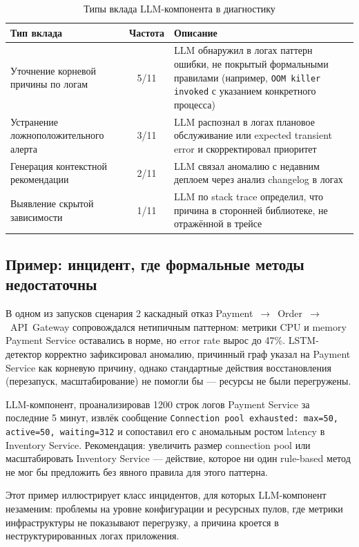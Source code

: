 \begin{table}[H]
\centering
\small
\caption{Типы вклада LLM-компонента в диагностику}
\label{tab:llm_contribution_types}
\begin{tabular}{|p{4cm}|c|p{6cm}|}
\hline
\textbf{Тип вклада} & \textbf{Частота} & \textbf{Описание} \\
\hline
Уточнение корневой причины по логам & 5/11 & LLM обнаружил в логах паттерн ошибки, не покрытый формальными правилами (например, \texttt{OOM killer invoked} с указанием конкретного процесса) \\
\hline
Устранение ложноположительного алерта & 3/11 & LLM распознал в логах плановое обслуживание или expected transient error и скорректировал приоритет \\
\hline
Генерация контекстной рекомендации & 2/11 & LLM связал аномалию с недавним деплоем через анализ changelog в логах \\
\hline
Выявление скрытой зависимости & 1/11 & LLM по stack trace определил, что причина в сторонней библиотеке, не отражённой в трейсе \\
\hline
\end{tabular}
\end{table}

\subsection{Пример: инцидент, где формальные методы недостаточны}

В одном из запусков сценария 2 каскадный отказ \linebreak Payment~$\to$~Order~$\to$~API~Gateway сопровождался нетипичным паттерном: метрики CPU и memory Payment Service оставались в норме, но error rate вырос до 47\%. LSTM-детектор корректно зафиксировал аномалию, причинный граф указал на Payment Service как корневую причину, однако стандартные действия восстановления (перезапуск, масштабирование) не помогли бы --- ресурсы не были перегружены.

LLM-компонент, проанализировав 1200 строк логов Payment Service за последние 5 минут, извлёк сообщение \texttt{Connection pool exhausted: max=50, active=50, waiting=312} и сопоставил его с аномальным ростом latency в Inventory Service. Рекомендация: увеличить размер connection pool или масштабировать Inventory Service --- действие, которое ни один rule-based метод не мог бы предложить без явного правила для этого паттерна.

Этот пример иллюстрирует класс инцидентов, для которых LLM-компонент незаменим: проблемы на уровне конфигурации и ресурсных пулов, где метрики инфраструктуры не показывают перегрузку, а причина кроется в неструктурированных логах приложения.

